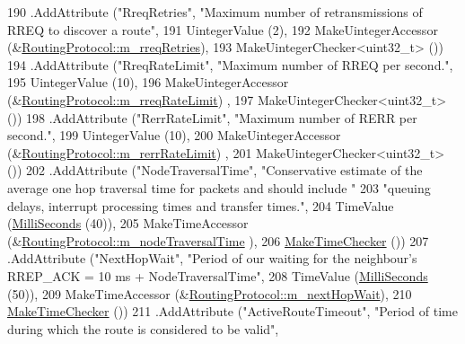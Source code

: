 \begin{DoxyCode}
190     .AddAttribute (\textcolor{stringliteral}{"RreqRetries"}, \textcolor{stringliteral}{"Maximum number of retransmissions of RREQ to discover a route"},
191                    UintegerValue (2),
192                    MakeUintegerAccessor (&\hyperlink{classns3_1_1aodv_1_1RoutingProtocol_abecbe245cb328bc299a47f9a8a89aa6e}{RoutingProtocol::m\_rreqRetries}),
193                    MakeUintegerChecker<uint32\_t> ())
194     .AddAttribute (\textcolor{stringliteral}{"RreqRateLimit"}, \textcolor{stringliteral}{"Maximum number of RREQ per second."},
195                    UintegerValue (10),
196                    MakeUintegerAccessor (&\hyperlink{classns3_1_1aodv_1_1RoutingProtocol_a543abca2b224dcde1362f1050f1887c7}{RoutingProtocol::m\_rreqRateLimit})
      ,
197                    MakeUintegerChecker<uint32\_t> ())
198     .AddAttribute (\textcolor{stringliteral}{"RerrRateLimit"}, \textcolor{stringliteral}{"Maximum number of RERR per second."},
199                    UintegerValue (10),
200                    MakeUintegerAccessor (&\hyperlink{classns3_1_1aodv_1_1RoutingProtocol_ad7a69761e61bcea41a2bc87ad8928e2d}{RoutingProtocol::m\_rerrRateLimit})
      ,
201                    MakeUintegerChecker<uint32\_t> ())
202     .AddAttribute (\textcolor{stringliteral}{"NodeTraversalTime"}, \textcolor{stringliteral}{"Conservative estimate of the average one hop traversal time for
       packets and should include "}
203                    \textcolor{stringliteral}{"queuing delays, interrupt processing times and transfer times."},
204                    TimeValue (\hyperlink{group__timecivil_gaf26127cf4571146b83a92ee18679c7a9}{MilliSeconds} (40)),
205                    MakeTimeAccessor (&\hyperlink{classns3_1_1aodv_1_1RoutingProtocol_ad467863779ea1559ad5942ff6c24a706}{RoutingProtocol::m\_nodeTraversalTime}
      ),
206                    \hyperlink{group__time_ga7032965bd4afa578691d88c09e4481c1}{MakeTimeChecker} ())
207     .AddAttribute (\textcolor{stringliteral}{"NextHopWait"}, \textcolor{stringliteral}{"Period of our waiting for the neighbour's RREP\_ACK = 10 ms +
       NodeTraversalTime"},
208                    TimeValue (\hyperlink{group__timecivil_gaf26127cf4571146b83a92ee18679c7a9}{MilliSeconds} (50)),
209                    MakeTimeAccessor (&\hyperlink{classns3_1_1aodv_1_1RoutingProtocol_aeac3f146e52514d060a69f1a2d62690b}{RoutingProtocol::m\_nextHopWait}),
210                    \hyperlink{group__time_ga7032965bd4afa578691d88c09e4481c1}{MakeTimeChecker} ())
211     .AddAttribute (\textcolor{stringliteral}{"ActiveRouteTimeout"}, \textcolor{stringliteral}{"Period of time during which the route is considered to be valid"},

\end{DoxyCode}
